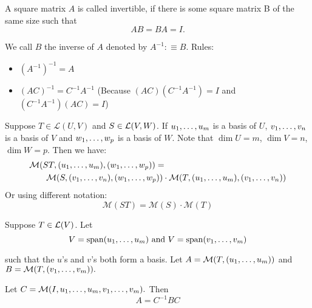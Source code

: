   \setcounter{thm}{79}
  \begin{mydef}
    A square matrix $A$ is called invertible, if there is some square matrix B of the same size such that
    \begin{equation}
    	AB=BA=I.
    \end{equation}

    We call $B$ the inverse of $A$ denoted by $A^{-1} :\equiv B$. Rules:
    \begin{itemize}
      \item $(A^{-1})^{-1}=A$
      \item $(AC)^{-1} = C^{-1}A^{-1}$ (Because $(AC)(C^{-1}A^{-1})=I$ and $(C^{-1}A^{-1})(AC)=I$)
    \end{itemize}
  \end{mydef}

  \begin{thm} 
    Suppose $T\in \mathcal{L}(U,V)$ and $S\in {\mathcal{L}(V,W)}$. If $u_1, \dots, u_m$ is a basis of $U$, $v_1, \dots, v_n$ is a basis of $V$ and $w_1, \dots, w_{p}$ is a basis of $W$. Note that $\dim U = m$, $\dim V = n$, $\dim W = p$. Then we have:
    \begin{equation}
    \begin{aligned}
      &\mathcal{M}(ST, (u_1, \dots, u_m), (w_1, \dots, w_{p})) = \\
      &\qquad \mathcal{M}(S, (v_1, \dots, v_n), (w_1, \dots, w_{p} ))
      \cdot
      \mathcal{M}(T, (u_1, \dots, u_m), (v_1, \dots, v_n   ))
    \end{aligned}
    \end{equation}
    Or using different notation:
    \begin{equation}
      \mathcal{M}(ST) = \mathcal{M}(S) \cdot \mathcal{M}(T)
    \end{equation}
  \end{thm}

  \setcounter{thm}{83}
  \begin{thm}
    Suppose $T \in \mathcal{L}(V)$. Let
    \begin{equation}
          V = \myspan{\onetillm{u}}
          $ and $V= \myspan{\onetillm{v}}
    \end{equation}

  such that the $u$'s and $v$'s both form a basis. Let $A=\mathcal{M}(T, (u_1, \dots, u_m))$ and $B=\mathcal{M}(T,(v_1, \dots, v_m)).$

   Let $C=\mathcal{M}(I, u_1, \dots, u_m, v_1, \dots, v_m).$ Then
    \begin{equation}
    A = C^{-1} B C
    \end{equation}
  \end{thm}

